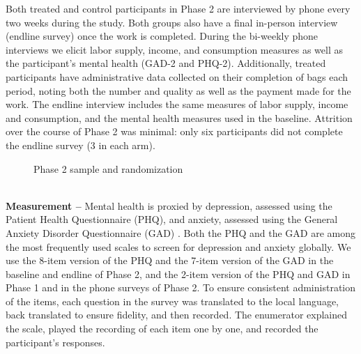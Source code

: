 \documentclass[12pt, a4paper, american]{article}
\begin{document}
Both treated and control participants in Phase 2 are interviewed by phone every two weeks during the study. Both groups also have a final in-person interview (endline survey) once the work is completed. During the bi-weekly phone interviews we elicit labor supply, income, and consumption measures as well as the participant's mental health (GAD-2 and PHQ-2). Additionally, treated participants have administrative data collected on their completion of bags each period, noting both the number and quality as well as the payment made for the work. The endline interview includes the same measures of labor supply, income and consumption, and the mental health measures used in the baseline. Attrition over the course of Phase 2 was minimal: only six participants did not complete the endline survey (3 in each arm).

\begin{figure}[h]
\caption{Phase 2 sample and randomization}\label{fig_phase2}
\centering
{}
\end{figure} 

\\

\textbf{Measurement --} Mental health is proxied by depression, assessed using the Patient Health Questionnaire (PHQ), and anxiety, assessed using  the General Anxiety Disorder Questionnaire (GAD)  \citep{phq9_2001,phq2_2003}. Both the PHQ and the GAD are among the most frequently used scales to screen for depression and anxiety globally. We use the 8-item version of the PHQ and the 7-item version of the GAD in the baseline and endline of Phase 2, and the 2-item version of the PHQ and GAD in Phase 1 and in the phone surveys of Phase 2. To ensure consistent administration of the items, each question in the survey was translated to the local language, back translated to ensure fidelity, and then recorded. The enumerator explained the scale, played the recording of each item one by one, and recorded the participant's responses.
\end{document}
